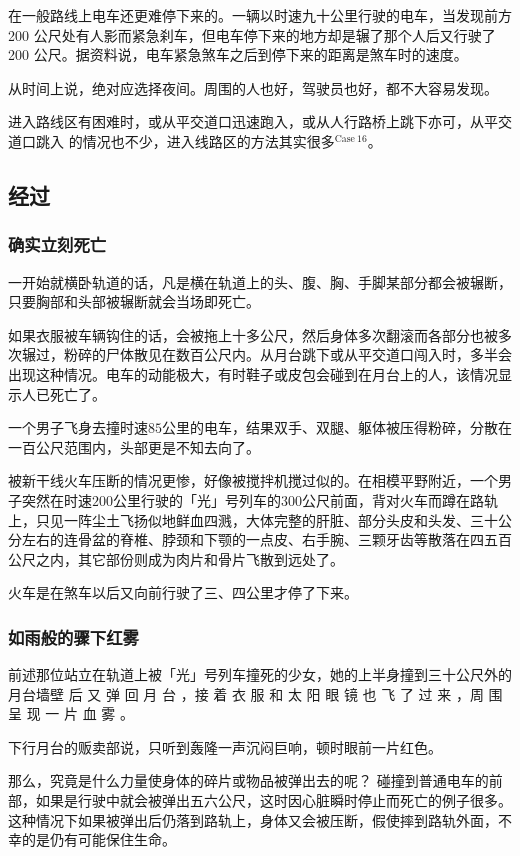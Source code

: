 \documentclass[UTF8]{ctexart}
\begin{document}
在一般路线上电车还更难停下来的。一辆以时速九十公里行驶的电车，当发现前方 200 公尺处有人影而紧急刹车，但电车停下来的地方却是辗了那个人后又行驶了 200 公尺。据资料说，电车紧急煞车之后到停下来的距离是煞车时的速度。

从时间上说，绝对应选择夜间。周围的人也好，驾驶员也好，都不大容易发现。 

进入路线区有困难时，或从平交道口迅速跑入，或从人行路桥上跳下亦可，从平交道口跳入 的情况也不少，进入线路区的方法其实很多$^{\mathrm{Case\ 16}}$。

\subsection{经过}

\subsubsection*{确实立刻死亡}

一开始就横卧轨道的话，凡是横在轨道上的头、腹、胸、手脚某部分都会被辗断，只要胸部和头部被辗断就会当场即死亡。

如果衣服被车辆钩住的话，会被拖上十多公尺，然后身体多次翻滚而各部分也被多次辗过，粉碎的尸体散见在数百公尺内。从月台跳下或从平交道口闯入时，多半会出现这种情况。电车的动能极大，有时鞋子或皮包会碰到在月台上的人，该情况显示人已死亡了。

一个男子飞身去撞时速$85$公里的电车，结果双手、双腿、躯体被压得粉碎，分散在一百公尺范围内，头部更是不知去向了。

被新干线火车压断的情况更惨，好像被搅拌机搅过似的。在相模平野附近，一个男子突然在时速$200$公里行驶的「光」号列车的$300$公尺前面，背对火车而蹲在路轨上，只见一阵尘土飞扬似地鲜血四溅，大体完整的肝脏、部分头皮和头发、三十公分左右的连骨盆的脊椎、脖颈和下颚的一点皮、右手腕、三颗牙齿等散落在四五百公尺之内，其它部份则成为肉片和骨片飞散到远处了。

火车是在煞车以后又向前行驶了三、四公里才停了下来。 

\subsubsection*{如雨般的骤下红雾}

前述那位站立在轨道上被「光」号列车撞死的少女，她的上半身撞到三十公尺外的月台墙壁 后 又 弹 回 月 台 ，接 着 衣 服 和 太 阳 眼 镜 也 飞 了 过 来 ，周 围 呈 现 一 片 血 雾 。

下行月台的贩卖部说，只听到轰隆一声沉闷巨响，顿时眼前一片红色。

那么，究竟是什么力量使身体的碎片或物品被弹出去的呢？ 碰撞到普通电车的前部，如果是行驶中就会被弹出五六公尺，这时因心脏瞬时停止而死亡的例子很多。
这种情况下如果被弹出后仍落到路轨上，身体又会被压断，假使摔到路轨外面，不幸的是仍有可能保住生命。
\end{document}

